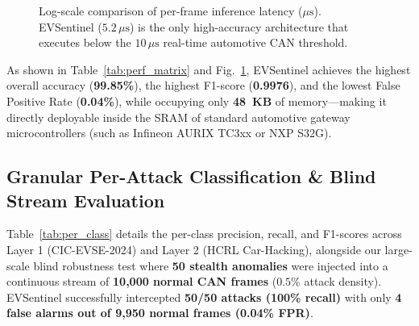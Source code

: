 \documentclass[conference]{IEEEtran}
\begin{document}
\begin{figure}[!t]
\centering
{}
\caption{Log-scale comparison of per-frame inference latency ($\mu\text{s}$). EVSentinel ($5.2\,\mu\text{s}$) is the only high-accuracy architecture that executes below the $10\,\mu\text{s}$ real-time automotive CAN threshold.}
\label{fig:latency}
\end{figure}

As shown in Table~\ref{tab:perf_matrix} and Fig.~\ref{fig:latency}, EVSentinel achieves the highest overall accuracy (\textbf{99.85\%}), the highest F1-score (\textbf{0.9976}), and the lowest False Positive Rate (\textbf{0.04\%}), while occupying only \textbf{48~KB} of memory---making it directly deployable inside the SRAM of standard automotive gateway microcontrollers (such as Infineon AURIX TC3xx or NXP S32G).

\subsection{Granular Per-Attack Classification & Blind Stream Evaluation}
Table~\ref{tab:per_class} details the per-class precision, recall, and F1-scores across Layer 1 (CIC-EVSE-2024) and Layer 2 (HCRL Car-Hacking), alongside our large-scale blind robustness test where \textbf{50 stealth anomalies} were injected into a continuous stream of \textbf{10,000 normal CAN frames} ($0.5\%$ attack density). EVSentinel successfully intercepted \textbf{50/50 attacks (100\% recall)} with only \textbf{4 false alarms out of 9,950 normal frames (0.04\% FPR)}.
\end{document}
